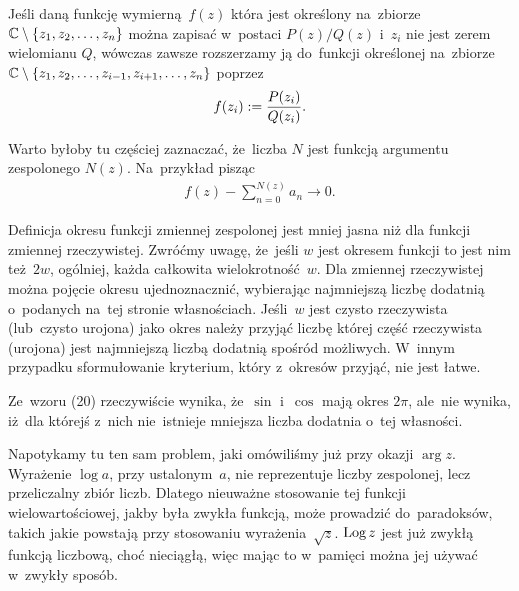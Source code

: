 \documentclass[a4paper,11pt]{article}
\begin{document}
Jeśli daną funkcję wymierną~$f( z )$ która jest określony na~zbiorze
$\mathbb{C} \setminus \{  z_{ 1 }, z_{ 2 }, \ldots, z_{ n }  \}$ można zapisać
w~postaci $P( z ) / Q( z )$ i~$z_{ i }$ nie jest zerem wielomianu $Q$,
wówczas zawsze rozszerzamy ją do~funkcji określonej na~zbiorze
$\mathbb{C} \setminus \{  z_{ 1 }, z_{ 2 }, \ldots, z_{ i - 1 }, z_{ i + 1 },
  \ldots, z_{ n }  \}$ poprzez
\begin{equation}
  \label{eq:Leja-36}
  \begin{split}
    f( z_{ i } ) := \frac{ P( z_{ i } ) }{ Q( z_{ i } ) }.
  \end{split}
\end{equation}

\vspace{\spaceFour}


\start {} Warto byłoby tu częściej zaznaczać, że~liczba $N$ jest
funkcją argumentu zespolonego $N( z )$. Na~przykład pisząc
\begin{equation}
  \label{eq:Leja-37}
  \begin{split}
    f( z ) - \sum_{ n = 0 }^{ N( z ) } a_{ n } \to 0.
  \end{split}
\end{equation}

\vspace{\spaceFour}


\start {} Definicja okresu funkcji zmiennej zespolonej jest
mniej jasna niż dla funkcji zmiennej rzeczywistej. Zwróćmy uwagę,
że~jeśli $w$ jest okresem funkcji to jest nim też~$2w$, ogólniej,
każda całkowita wielokrotność~$w$. Dla zmiennej rzeczywistej można
pojęcie okresu ujednoznacznić, wybierając najmniejszą liczbę dodatnią
o~podanych na~tej stronie własnościach. Jeśli~$w$ jest czysto
rzeczywista (lub~czysto urojona) jako okres należy przyjąć liczbę
której część rzeczywista (urojona) jest najmniejszą liczbą dodatnią
spośród możliwych. W~innym przypadku sformułowanie kryterium, który
z~okresów przyjąć, nie jest łatwe.

\vspace{\spaceFour}


\start {} Ze~wzoru (20) rzeczywiście wynika, że~$\sin$ i~$\cos$
mają okres $2\pi$, ale~nie wynika, iż~dla którejś z~nich nie~istnieje
mniejsza liczba dodatnia o~tej własności.

\vspace{\spaceFour}


\start {} Napotykamy tu ten sam problem, jaki omówiliśmy już
przy okazji $\arg z$. Wyrażenie $\log a$, przy ustalonym~$a$, nie
reprezentuje liczby zespolonej, lecz przeliczalny zbiór liczb. Dlatego
nieuważne stosowanie tej funkcji wielowartościowej, jakby była zwykła
funkcją, może prowadzić do~paradoksów, takich jakie powstają przy
stosowaniu wyrażenia~$\sqrt{ z }$. $\textrm{Log}\, z$ jest już zwykłą
funkcją liczbową, choć nieciągłą, więc mając to w~pamięci można jej
używać w~zwykły sposób.
\end{document}
